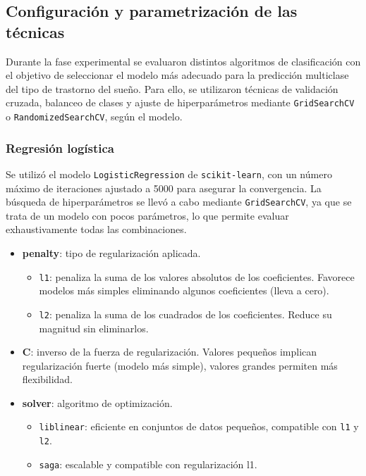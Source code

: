 \subsection{Configuración y parametrización de las técnicas}

Durante la fase experimental se evaluaron distintos algoritmos de clasificación con el objetivo de seleccionar el modelo más adecuado para la predicción multiclase del tipo de trastorno del sueño. Para ello, se utilizaron técnicas de validación cruzada, balanceo de clases y ajuste de hiperparámetros mediante \texttt{GridSearchCV} o \texttt{RandomizedSearchCV}, según el modelo.

\subsubsection{Regresión logística}

Se utilizó el modelo \texttt{LogisticRegression} de \texttt{scikit-learn}, con un número máximo de iteraciones ajustado a 5000 para asegurar la convergencia. La búsqueda de hiperparámetros se llevó a cabo mediante \texttt{GridSearchCV}, ya que se trata de un modelo con pocos parámetros, lo que permite evaluar exhaustivamente todas las combinaciones.

\begin{itemize}
    \item \textbf{penalty}: tipo de regularización aplicada.
    \begin{itemize}
        \item \texttt{l1}: penaliza la suma de los valores absolutos de los coeficientes. Favorece modelos más simples eliminando algunos coeficientes (lleva a cero).
        \item \texttt{l2}: penaliza la suma de los cuadrados de los coeficientes. Reduce su magnitud sin eliminarlos.
    \end{itemize}
    \item \textbf{C}: inverso de la fuerza de regularización. Valores pequeños implican regularización fuerte (modelo más simple), valores grandes permiten más flexibilidad.
    \item \textbf{solver}: algoritmo de optimización.
    \begin{itemize}
        \item \texttt{liblinear}: eficiente en conjuntos de datos pequeños, compatible con \texttt{l1} y \texttt{l2}.
        \item \texttt{saga}: escalable y compatible con regularización l1.
    \end{itemize}
\end{itemize}

